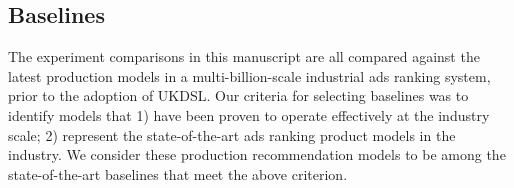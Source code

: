 \subsection{Baselines}


The experiment comparisons in this manuscript are all compared against the latest production models in a multi-billion-scale industrial ads ranking system, prior to the adoption of UKDSL. 
Our criteria for selecting baselines was to identify models that 1) have been proven to operate effectively at the industry scale; 2) represent the  state-of-the-art ads ranking product models  in the industry.
We consider these production recommendation models to be among the state-of-the-art baselines that meet the above criterion. 
 